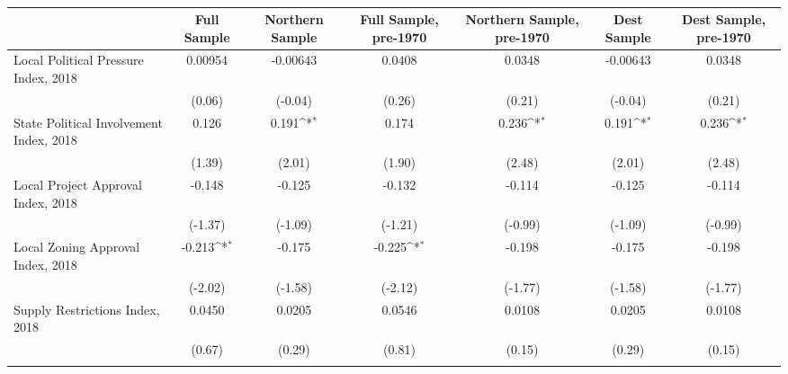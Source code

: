 \begin{table}[htbp]\centering
\def\sym#1{\ifmmode^{#1}\else\(^{#1}\)\fi}
\caption{ \label{tab1}}
\begin{tabular}{l*{6}{c}}
\toprule
                    &\multicolumn{1}{c}{Full Sample}&\multicolumn{1}{c}{Northern Sample}&\multicolumn{1}{c}{Full Sample, pre-1970}&\multicolumn{1}{c}{Northern Sample, pre-1970}&\multicolumn{1}{c}{Dest Sample}&\multicolumn{1}{c}{Dest Sample, pre-1970}\\
\midrule
Local Political Pressure Index, 2018&     0.00954         &    -0.00643         &      0.0408         &      0.0348         &    -0.00643         &      0.0348         \\
                    &      (0.06)         &     (-0.04)         &      (0.26)         &      (0.21)         &     (-0.04)         &      (0.21)         \\
\addlinespace
State Political Involvement Index, 2018&       0.126         &       0.191\sym{*}  &       0.174         &       0.236\sym{*}  &       0.191\sym{*}  &       0.236\sym{*}  \\
                    &      (1.39)         &      (2.01)         &      (1.90)         &      (2.48)         &      (2.01)         &      (2.48)         \\
\addlinespace
Local Project Approval Index, 2018&      -0.148         &      -0.125         &      -0.132         &      -0.114         &      -0.125         &      -0.114         \\
                    &     (-1.37)         &     (-1.09)         &     (-1.21)         &     (-0.99)         &     (-1.09)         &     (-0.99)         \\
\addlinespace
Local Zoning Approval Index, 2018&      -0.213\sym{*}  &      -0.175         &      -0.225\sym{*}  &      -0.198         &      -0.175         &      -0.198         \\
                    &     (-2.02)         &     (-1.58)         &     (-2.12)         &     (-1.77)         &     (-1.58)         &     (-1.77)         \\
\addlinespace
Supply Restrictions Index, 2018&      0.0450         &      0.0205         &      0.0546         &      0.0108         &      0.0205         &      0.0108         \\
                    &      (0.67)         &      (0.29)         &      (0.81)         &      (0.15)         &      (0.29)         &      (0.15)         \\
\addlinespace

\end{tabular}
\end{table}
